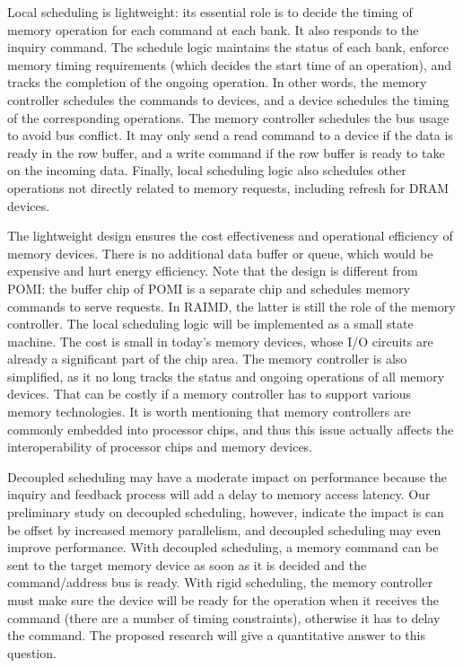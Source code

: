 \documentclass[11pt]{article}
\begin{document}
Local scheduling is lightweight: its essential role is to decide the timing of
memory operation for each command at each bank.  It also responds to the inquiry
command.  The schedule logic maintains the status of each bank, enforce memory
timing requirements (which decides the start time of an operation), and tracks
the completion of the ongoing operation.  In other words, the memory controller
schedules the commands to devices, and a device schedules the timing of the
corresponding operations.  The memory controller schedules the bus usage to
avoid bus conflict.  It may only send a read command to a device if the data is
ready in the row buffer, and a write command if the row buffer is ready to take
on the incoming data.  Finally, local scheduling logic also schedules other
operations not directly related to memory requests, including refresh for DRAM
devices.

The lightweight design ensures the cost effectiveness and operational efficiency
of memory devices.  There is no additional data buffer or queue, which would be
expensive and hurt energy efficiency.  Note that the design is different from
POMI: the buffer chip of POMI is a separate chip and schedules memory commands
to serve requests. In RAIMD, the latter is still the role of the memory
controller.  The local scheduling logic will be implemented as a small state
machine. The cost is small in today's memory devices, whose I/O circuits are
already a significant part of the chip area.  The memory controller is also
simplified, as it no long tracks the status and ongoing operations of all memory
devices.  That can be costly if a memory controller has to support various
memory technologies.  It is worth mentioning that memory controllers are
commonly embedded into processor chips, and thus this issue actually affects the
interoperability of processor chips and memory devices.

Decoupled scheduling may have a moderate impact on performance because the
inquiry and feedback process will add a delay to memory access latency.  Our
preliminary study on decoupled scheduling, however, indicate the impact is can
be offset by increased memory parallelism, and decoupled scheduling may even
improve performance.  With decoupled scheduling, a memory command can be sent to
the target memory device as soon as it is decided and the command/address bus is
ready.  With rigid scheduling, the memory controller must make sure the device
will be ready for the operation when it receives the command (there are a number
of timing constraints), otherwise it has to delay the command.  The proposed
research will give a quantitative answer to this question.
\end{document}
